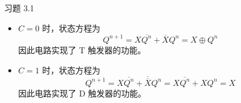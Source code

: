 \begin{problem}
    习题 3.1
    \begin{solution}
        \begin{itemize}
            \item $C = 0$ 时，状态方程为
            $$
            Q^{n + 1} = X \overline{Q^{n}} + \overline{X} Q^{n} = X \oplus Q^{n}
            $$
            因此电路实现了 T 触发器的功能。
            
            \item $C = 1$ 时，状态方程为
            $$
            Q^{n + 1} = X \overline{Q^{n}} + \overline{\overline{X}} Q^{n} = X \overline{Q^{n}} + X Q^{n} = X
            $$
            因此电路实现了 D 触发器的功能。
        \end{itemize}
    \end{solution}
\end{problem}

